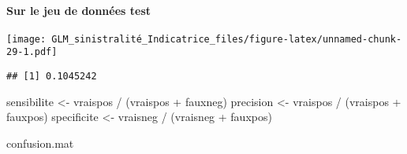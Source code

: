 \documentclass[
]{article}
\newenvironment{Shaded}{\begin{snugshade}}{\end{snugshade}}
\newcommand{\AttributeTok}[1]{\textcolor[rgb]{0.77,0.63,0.00}{#1}}
\newcommand{\DecValTok}[1]{\textcolor[rgb]{0.00,0.00,0.81}{#1}}
\newcommand{\FunctionTok}[1]{\textcolor[rgb]{0.00,0.00,0.00}{#1}}
\newcommand{\NormalTok}[1]{#1}
\newcommand{\OtherTok}[1]{\textcolor[rgb]{0.56,0.35,0.01}{#1}}
\newcommand{\SpecialCharTok}[1]{\textcolor[rgb]{0.00,0.00,0.00}{#1}}
\newcommand{\StringTok}[1]{\textcolor[rgb]{0.31,0.60,0.02}{#1}}
\begin{document}
\hypertarget{sur-le-jeu-de-donnuxe9es-test-1}{%
\paragraph{Sur le jeu de données
test}\label{sur-le-jeu-de-donnuxe9es-test-1}}

\begin{Shaded}
\end{Shaded}

\texttt{[image: GLM\_sinistralité\_Indicatrice\_files/figure-latex/unnamed-chunk-29-1.pdf]}

\begin{Shaded}
\end{Shaded}

\begin{verbatim}
## [1] 0.1045242
\end{verbatim}

\begin{Shaded}
\begin{Highlighting}[]
\NormalTok{sensibilite }\OtherTok{\textless{}{-}}\NormalTok{ vraispos }\SpecialCharTok{/}\NormalTok{ (vraispos }\SpecialCharTok{+}\NormalTok{ fauxneg)   }
\NormalTok{precision }\OtherTok{\textless{}{-}}\NormalTok{ vraispos }\SpecialCharTok{/}\NormalTok{ (vraispos }\SpecialCharTok{+}\NormalTok{ fauxpos) }
\NormalTok{specificite }\OtherTok{\textless{}{-}}\NormalTok{ vraisneg }\SpecialCharTok{/}\NormalTok{ (vraisneg }\SpecialCharTok{+}\NormalTok{ fauxpos)}

\NormalTok{confusion.mat}
\end{Highlighting}
\end{Shaded}
\end{document}
